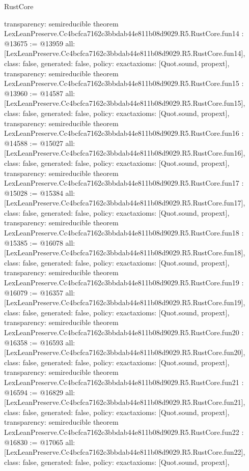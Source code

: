\begin{lexlean}{RustCore}
\begin{coremodule}
{  transparency: semireducible
}
theorem LexLeanPreserve.Cc4bcfca7162c3bbdab44e811b08d9029.R5.RustCore.fun14 : @13675 := @13959 {
  all: [LexLeanPreserve.Cc4bcfca7162c3bbdab44e811b08d9029.R5.RustCore.fun14],
  class: false,
  generated: false,
  policy: exact{axioms: [Quot.sound, propext]},
  transparency: semireducible
}
theorem LexLeanPreserve.Cc4bcfca7162c3bbdab44e811b08d9029.R5.RustCore.fun15 : @13960 := @14587 {
  all: [LexLeanPreserve.Cc4bcfca7162c3bbdab44e811b08d9029.R5.RustCore.fun15],
  class: false,
  generated: false,
  policy: exact{axioms: [Quot.sound, propext]},
  transparency: semireducible
}
theorem LexLeanPreserve.Cc4bcfca7162c3bbdab44e811b08d9029.R5.RustCore.fun16 : @14588 := @15027 {
  all: [LexLeanPreserve.Cc4bcfca7162c3bbdab44e811b08d9029.R5.RustCore.fun16],
  class: false,
  generated: false,
  policy: exact{axioms: [Quot.sound, propext]},
  transparency: semireducible
}
theorem LexLeanPreserve.Cc4bcfca7162c3bbdab44e811b08d9029.R5.RustCore.fun17 : @15028 := @15384 {
  all: [LexLeanPreserve.Cc4bcfca7162c3bbdab44e811b08d9029.R5.RustCore.fun17],
  class: false,
  generated: false,
  policy: exact{axioms: [Quot.sound, propext]},
  transparency: semireducible
}
theorem LexLeanPreserve.Cc4bcfca7162c3bbdab44e811b08d9029.R5.RustCore.fun18 : @15385 := @16078 {
  all: [LexLeanPreserve.Cc4bcfca7162c3bbdab44e811b08d9029.R5.RustCore.fun18],
  class: false,
  generated: false,
  policy: exact{axioms: [Quot.sound, propext]},
  transparency: semireducible
}
theorem LexLeanPreserve.Cc4bcfca7162c3bbdab44e811b08d9029.R5.RustCore.fun19 : @16079 := @16357 {
  all: [LexLeanPreserve.Cc4bcfca7162c3bbdab44e811b08d9029.R5.RustCore.fun19],
  class: false,
  generated: false,
  policy: exact{axioms: [Quot.sound, propext]},
  transparency: semireducible
}
theorem LexLeanPreserve.Cc4bcfca7162c3bbdab44e811b08d9029.R5.RustCore.fun20 : @16358 := @16593 {
  all: [LexLeanPreserve.Cc4bcfca7162c3bbdab44e811b08d9029.R5.RustCore.fun20],
  class: false,
  generated: false,
  policy: exact{axioms: [Quot.sound, propext]},
  transparency: semireducible
}
theorem LexLeanPreserve.Cc4bcfca7162c3bbdab44e811b08d9029.R5.RustCore.fun21 : @16594 := @16829 {
  all: [LexLeanPreserve.Cc4bcfca7162c3bbdab44e811b08d9029.R5.RustCore.fun21],
  class: false,
  generated: false,
  policy: exact{axioms: [Quot.sound, propext]},
  transparency: semireducible
}
theorem LexLeanPreserve.Cc4bcfca7162c3bbdab44e811b08d9029.R5.RustCore.fun22 : @16830 := @17065 {
  all: [LexLeanPreserve.Cc4bcfca7162c3bbdab44e811b08d9029.R5.RustCore.fun22],
  class: false,
  generated: false,
  policy: exact{axioms: [Quot.sound, propext]},
}
\end{coremodule}
\end{lexlean}
